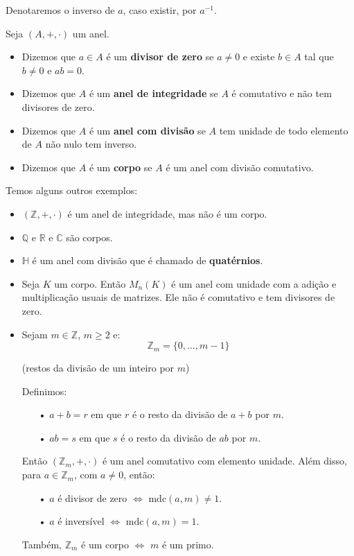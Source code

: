 \documentclass[11pt,twoside,a4paper]{book}
\begin{document}
\begin{notacao}
Denotaremos o inverso de $a$, caso existir, por $a^{-1}$.
\end{notacao}

\begin{definicao}
Seja $(A,+,\cdot)$ um anel.
\begin{itemize}
\item Dizemos que $a\in A$ é um \textbf{divisor de zero} se $a\neq 0$ e existe $b\in A$ tal que $b\neq 0$ e $ab=0$.
\item Dizemos que $A$ é um \textbf{anel de integridade} se $A$ é comutativo e não tem divisores de zero.
\item Dizemos que $A$ é um \textbf{anel com divisão} se $A$ tem unidade de todo elemento de $A$ não nulo tem inverso.
\item Dizemos que $A$ é um \textbf{corpo} se $A$ é um anel com divisão comutativo.
\end{itemize}
\end{definicao}

\begin{exemplo}
Temos alguns outros exemplos:
\begin{itemize}
\item $(\mathbb{Z},+,\cdot)$ é um anel de integridade, mas não é um corpo.
\item $\mathbb{Q}$ e $\mathbb{R}$ e $\mathbb{C}$ são corpos.
\item $\mathbb{H}$ é um anel com divisão que é chamado de \textbf{quatérnios}.
\item Seja $K$ um corpo. Então $M_n(K)$ é um anel com unidade com a adição e multiplicação usuais de matrizes. Ele não é comutativo e tem divisores de zero.
\item Sejam $m\in\mathbb{Z}$, $m\geq 2$ e:
\[
\mathbb{Z}_m=\{0,\dots,m-1\}
\]
\begin{center}
(restos da divisão de um inteiro por $m$)
\end{center}
Definimos:
\begin{itemize}
\item[•] $a+b=r$ em que $r$ é o resto da divisão de $a+b$ por $m$.
\item[•] $ab=s$ em que $s$ é o resto da divisão de $ab$ por $m$.
\end{itemize}
Então $(\mathbb{Z}_m,+,\cdot)$ é um anel comutativo com elemento unidade. Além disso, para $a\in\mathbb{Z}_m$, com $a\neq 0$, então:
\begin{itemize}
\item[•] $a$ é divisor de zero $\Longleftrightarrow$ $\mathrm{mdc}(a,m)\neq 1$.
\item[•] $a$ é inversível $\Longleftrightarrow$ $\mathrm{mdc}(a,m)=1$.
\end{itemize}
Também, $\mathbb{Z}_m$ é um corpo $\Longleftrightarrow$ $m$ é um primo.
\end{itemize}
\end{exemplo}
\end{document}
